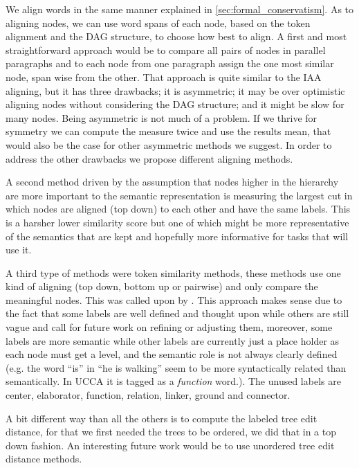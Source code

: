 \documentclass[letter,11pt]{article}
\begin{document}
		We align words in the same manner explained in \ref{sec:formal_conservatism}.
		As to aligning nodes, we can use word spans of each node, based on
		the token alignment and the DAG structure, to choose how best to align.
		A first and most straightforward approach would be to compare all
		pairs of nodes in parallel paragraphs and to each node from one paragraph
		assign the one most similar node, span wise from the other. That approach
		is quite similar to the IAA aligning, but it
		has three drawbacks; it is asymmetric; it may be over optimistic aligning
		nodes without considering the DAG structure; and it might be
		slow for many nodes. Being asymmetric is not much of a problem. If we thrive for symmetry
		we can compute the measure twice and use the results mean,
		that would also be the case for other asymmetric methods we suggest.
		In order to address the other drawbacks we propose different aligning methods.
		
		A second method driven by the assumption that nodes higher in the
		hierarchy are more important to the semantic representation is measuring
		the largest cut in which nodes are aligned (top down) to each other
		and have the same labels. This is a harsher lower similarity
		score but one of which might be more representative of the semantics
		that are kept and hopefully more informative for tasks that will use it.
		
		A third type of methods were token similarity methods, these methods
		use one kind of aligning (top down, bottom up or pairwise) and only
		compare the meaningful nodes. This was called upon by \cite{sulem2015conceptual}. 
		This approach makes sense due to the fact that some labels
		are well defined and thought upon while others are still vague and
		call for future work on refining or adjusting them, moreover, some
		labels are more semantic while other labels are currently just a place
		holder as each node must get a level, and the semantic role is not
		always clearly defined (e.g. the word ``is'' in ``he is walking''
		seem to be more syntactically related than semantically. In UCCA it is tagged as a \textit{function} word.). The unused
		labels are center, elaborator, function, relation, linker, ground
		and connector.
		
		A bit different way than all the others is to compute the labeled
		tree edit distance\cite{zhang1989simple}, for that we first needed
		the trees to be ordered, we did that in a top down fashion. An interesting
		future work would be to use unordered tree edit distance methods\cite{zhang1992editing}.
		
\end{document}
